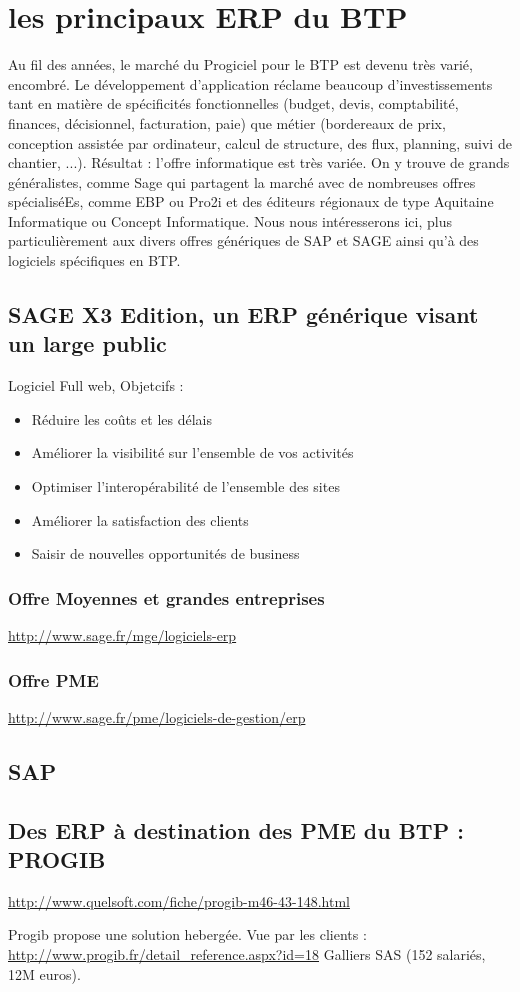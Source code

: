 \section{les principaux ERP du BTP}
Au fil des années, le marché du Progiciel pour le BTP est devenu très varié, encombré. 
Le développement d'application réclame beaucoup d'investissements tant en matière de spécificités fonctionnelles (budget, devis, comptabilité, finances, décisionnel, facturation, paie) que métier (bordereaux de prix, conception assistée par ordinateur, calcul de structure, des flux, planning, suivi de chantier, ...). 
Résultat : l'offre informatique est très variée. On y trouve de grands généralistes, comme Sage qui partagent la marché avec de nombreuses offres spécialiséEs, comme EBP ou Pro2i et des éditeurs régionaux de type Aquitaine Informatique ou Concept Informatique.
Nous nous intéresserons ici, plus particulièrement aux divers offres génériques de SAP et SAGE ainsi qu'à des logiciels spécifiques en BTP.
\subsection{SAGE X3 Edition, un ERP générique visant un large public}
Logiciel Full web,
Objetcifs :
\begin{itemize}
    \item Réduire les coûts et les délais
    \item Améliorer la visibilité sur l'ensemble de vos activités
	\item Optimiser l'interopérabilité de l'ensemble des sites
    \item Améliorer la satisfaction des clients
	\item Saisir de nouvelles opportunités de business
\end{itemize}

\subsubsection{Offre Moyennes et grandes entreprises}
\url{http://www.sage.fr/mge/logiciels-erp}
\subsubsection{Offre PME}
\url{http://www.sage.fr/pme/logiciels-de-gestion/erp}

\subsection{SAP}

\subsection{Des ERP à destination des PME du BTP : PROGIB}
\url{http://www.quelsoft.com/fiche/progib-m46-43-148.html}
 
Progib propose une solution hebergée.
Vue par les clients :
\url{http://www.progib.fr/detail_reference.aspx?id=18}
Galliers SAS (152 salariés, 12M euros).